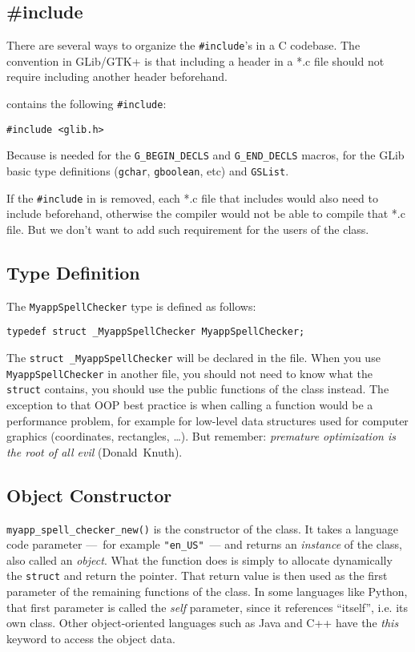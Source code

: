 \subsection{\#include}
\label{oop-include-in-header}
There are several ways to organize the \lstinline{#include}'s in a C codebase. The convention in GLib/GTK+ is that including a header in a *.c file should not require including another header beforehand.

 contains the following \lstinline{#include}:
\begin{lstlisting}
#include <glib.h>
\end{lstlisting}

Because  is needed for the \lstinline{G_BEGIN_DECLS} and \lstinline{G_END_DECLS} macros, for the GLib basic type definitions (\lstinline{gchar}, \lstinline{gboolean}, etc) and \lstinline{GSList}.

If the \lstinline{#include} in  is removed, each *.c file that includes  would also need to include  beforehand, otherwise the compiler would not be able to compile that *.c file. But we don't want to add such requirement for the users of the class.

\subsection{Type Definition}
The \lstinline{MyappSpellChecker} type is defined as follows:

\begin{lstlisting}
typedef struct _MyappSpellChecker MyappSpellChecker;
\end{lstlisting}

The \lstinline{struct _MyappSpellChecker} will be declared in the  file. When you use \lstinline{MyappSpellChecker} in another file, you should not need to know what the \lstinline{struct} contains, you should use the public functions of the class instead. The exception to that OOP best practice is when calling a function would be a performance problem, for example for low-level data structures used for computer graphics (coordinates, rectangles, …). But remember: \emph{premature optimization is the root of all evil} (Donald~Knuth).

\subsection{Object Constructor}
\lstinline{myapp_spell_checker_new()} is the constructor of the class. It takes a language code parameter ---~for example \lstinline{"en_US"}~--- and returns an \emph{instance} of the class, also called an \emph{object}. What the function does is simply to allocate dynamically the \lstinline{struct} and return the pointer. That return value is then used as the first parameter of the remaining functions of the class. In some languages like Python, that first parameter is called the \emph{self} parameter, since it references ``itself'', i.e. its own class. Other object-oriented languages such as Java and C++ have the \emph{this} keyword to access the object data.

